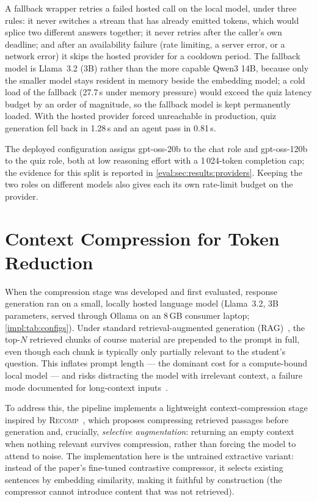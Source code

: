 A fallback wrapper retries a failed hosted call on the local model, under
three rules: it never switches a stream that has already emitted tokens,
which would splice two different answers together; it never retries after
the caller's own deadline; and after an availability failure (rate limiting,
a server error, or a network error) it skips the hosted provider for a
cooldown period. The fallback model is Llama~3.2 (3B) rather than the more
capable Qwen3 14B, because only the smaller model stays resident in memory
beside the embedding model; a cold load of the fallback (27.7\,s under
memory pressure) would exceed the quiz latency budget by an order of
magnitude, so the fallback model is kept permanently loaded. With the hosted
provider forced unreachable in production, quiz generation fell back in
1.28\,s and an agent pass in 0.81\,s.

The deployed configuration assigns gpt-oss-20b to the chat role and
gpt-oss-120b to the quiz role, both at low reasoning effort with a
1\,024-token completion cap; the evidence for this split is reported in
\autoref{eval:sec:results:providers}. Keeping the two roles on different
models also gives each its own rate-limit budget on the provider.

\section{Context Compression for Token Reduction}
\label{impl:sec:compression}

When the compression stage was developed and first evaluated, response generation
ran on a small, locally hosted language model (Llama~3.2, 3B parameters, served
through Ollama on an 8\,GB consumer laptop; \autoref{impl:tab:configs}). Under standard retrieval-augmented generation
(RAG)~\cite{neurips20:Lewis}, the top-$N$ retrieved chunks of course material are
prepended to the prompt in full, even though each chunk is typically only
partially relevant to the student's question. This inflates prompt length --- the
dominant cost for a compute-bound local model --- and risks distracting the model
with irrelevant context, a failure mode documented for long-context
inputs~\cite{tacl24:Liu}.

To address this, the pipeline implements a lightweight context-compression stage
inspired by \textsc{Recomp}~\cite{iclr24:Xu}, which proposes compressing retrieved
passages before generation and, crucially, \emph{selective augmentation}:
returning an empty context when nothing relevant survives compression, rather than
forcing the model to attend to noise. The implementation here is the untrained
extractive variant: instead of the paper's fine-tuned contrastive compressor, it
selects existing sentences by embedding similarity, making it faithful by
construction (the compressor cannot introduce content that was not retrieved).

